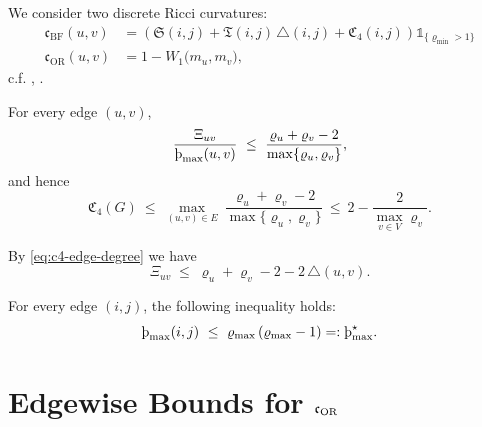 \documentclass[twoside,11pt]{article}
\numberwithin{equation}{section}
\numberwithin{theorem}{section}
\numberwithin{example}{section}
\newcommand{\sho}{\textup{\text{\th}}}
\begin{document}
\begin{definition}
We consider two discrete Ricci curvatures:
\begin{align}
\mathfrak c_{\mathrm{BF}}(u,v)
&= \left(\mathfrak S(i,j)+\mathfrak T(i,j)\,\triangle(i,j)+\mathfrak C_4(i,j)\right)\mathds{1}_{\{\varrho_{\min}>1\}}
\label{eq:BF-lower-decomp}
\\[5pt]
\mathfrak c_{\mathrm{OR}}(u,v)
&=1-W_1\!\bigl(m_u,m_v\bigr),
\label{eq:cOR}
\end{align}
c.f. \citet[Definition~1]{topping_squashing_2022}, \citet[Definition~3]{ollivier_ricci_2009}.
\end{definition}


\begin{lemma} 
\label{lem:C4-degree-only} 
For every edge $(u,v)$, 
\begin{equation} 
\label{eq:c4-edge-degree}
\frac{\Xi_{uv}}{\sho_{\max}(u,v)} \ \le\ \frac{\varrho_u+\varrho_v-2}{\max\{\varrho_u,\varrho_v\}}, 
\end{equation} 
and hence 
\begin{equation} 
\label{eq:c4-global-degree} 
\mathfrak C_4(G) \ \le\ \max_{(u,v)\in E}\ \frac{\varrho_u+\varrho_v-2}{\max\{\varrho_u,\varrho_v\}} \ \le\ 2-\frac{2}{\displaystyle\max_{v\in V}\varrho_{v}}. 
\end{equation} 
\end{lemma} 

\begin{corollary}
By \eqref{eq:c4-edge-degree} we have
\begin{equation}
\label{eq:Xi-max-structural-sharp}
\Xi_{uv} \;\leq\; \varrho_u + \varrho_v - 2 - 2\,\triangle(u,v).
\end{equation}
\end{corollary}

\begin{lemma}
\label{lem:box_count}
For every edge $(i,j)$, the following inequality holds:
\begin{equation}
\label{eq:sho-star}
\sho_{\max}(i,j)\ \le\ \varrho_{\max}\,(\varrho_{\max}-1)=:\sho^\star_{\max}.
\end{equation}
\end{lemma}



\section{Edgewise Bounds for \texorpdfstring{$\mathfrak c_{\rm OR}$}{cOR}}
\label{sec:edge-bound-or}
\end{document}
